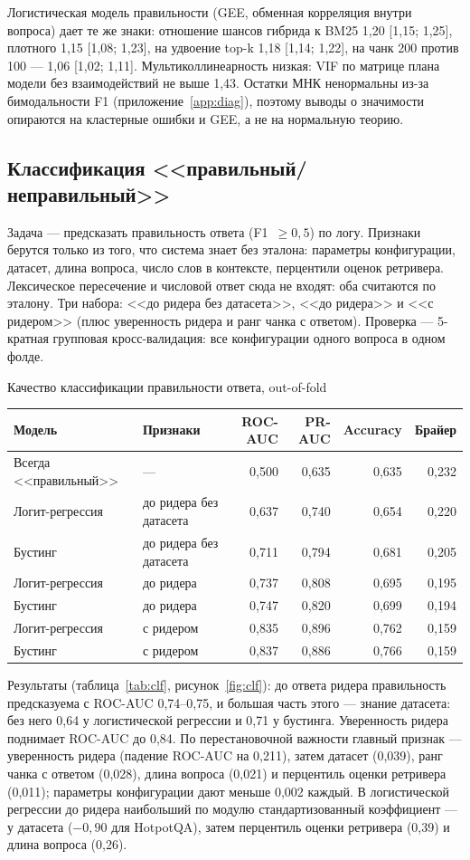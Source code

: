 Логистическая модель правильности (GEE, обменная корреляция внутри вопроса) дает те же знаки: отношение шансов гибрида к BM25 1,20 [1,15; 1,25], плотного 1,15 [1,08; 1,23], на удвоение top-k 1,18 [1,14; 1,22], на чанк 200 против 100 --- 1,06 [1,02; 1,11]. Мультиколлинеарность низкая: VIF по матрице плана модели без взаимодействий не выше 1,43. Остатки МНК ненормальны из-за бимодальности F1 (приложение~\ref{app:diag}), поэтому выводы о значимости опираются на кластерные ошибки и GEE, а не на нормальную теорию.

\subsection{Классификация <<правильный/неправильный>>}

Задача --- предсказать правильность ответа (F1~$\ge 0{,}5$) по логу. Признаки берутся только из того, что система знает без эталона: параметры конфигурации, датасет, длина вопроса, число слов в контексте, перцентили оценок ретривера. Лексическое пересечение и числовой ответ сюда не входят: оба считаются по эталону. Три набора: <<до ридера без датасета>>, <<до ридера>> и <<с ридером>> (плюс уверенность ридера и ранг чанка с ответом). Проверка --- 5-кратная групповая кросс-валидация: все конфигурации одного вопроса в одном фолде.

\begin{gosttable}{Качество классификации правильности ответа, out-of-fold}\label{tab:clf}
\begin{tabular}{llrrrr}
\toprule
Модель & Признаки & ROC-AUC & PR-AUC & Accuracy & Брайер \\
\midrule
Всегда <<правильный>> & --- & 0,500 & 0,635 & 0,635 & 0,232 \\
Логит-регрессия & до ридера без датасета & 0,637 & 0,740 & 0,654 & 0,220 \\
Бустинг & до ридера без датасета & 0,711 & 0,794 & 0,681 & 0,205 \\
Логит-регрессия & до ридера & 0,737 & 0,808 & 0,695 & 0,195 \\
Бустинг & до ридера & 0,747 & 0,820 & 0,699 & 0,194 \\
Логит-регрессия & с ридером & 0,835 & 0,896 & 0,762 & 0,159 \\
Бустинг & с ридером & 0,837 & 0,886 & 0,766 & 0,159 \\
\bottomrule
\end{tabular}
\end{gosttable}

Результаты (таблица~\ref{tab:clf}, рисунок~\ref{fig:clf}): до ответа ридера правильность предсказуема с ROC-AUC 0,74--0,75, и большая часть этого --- знание датасета: без него 0,64 у логистической регрессии и 0,71 у бустинга. Уверенность ридера поднимает ROC-AUC до 0,84. По перестановочной важности главный признак --- уверенность ридера (падение ROC-AUC на 0,211), затем датасет (0,039), ранг чанка с ответом (0,028), длина вопроса (0,021) и перцентиль оценки ретривера (0,011); параметры конфигурации дают меньше 0,002 каждый. В логистической регрессии до ридера наибольший по модулю стандартизованный коэффициент --- у датасета ($-0{,}90$ для HotpotQA), затем перцентиль оценки ретривера (0,39) и длина вопроса (0,26).

